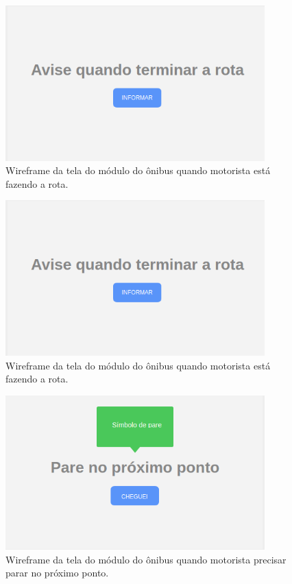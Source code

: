\documentclass[
	12pt,				%
	oneside,			%
	a4paper,			%
	brazil				%
]{abntex2}
\begin{document}
{\begin{apendicesenv}
\begin{figure}[!h]
\centering
\includegraphics[width=10cm, center]{images/busmodule-finish-route}
\caption{Wireframe da tela do módulo do ônibus quando motorista está fazendo a rota.}
\label{Rotulo}
\end{figure}

\begin{figure}[!h]
\centering
\includegraphics[width=10cm, center]{images/busmodule-finish-route}
\caption{Wireframe da tela do módulo do ônibus quando motorista está fazendo a rota.}
\label{Rotulo}
\end{figure}

\begin{figure}[!h]
\centering
\includegraphics[width=10cm, center]{images/busmodule-pare}
\caption{Wireframe da tela do módulo do ônibus quando motorista precisar parar no próximo ponto.}
\label{Rotulo}
\end{figure}


\end{apendicesenv}}
\end{document}
